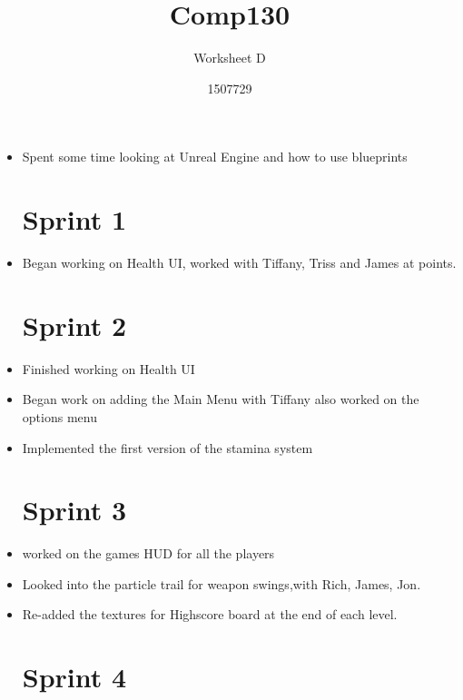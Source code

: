 \documentclass{scrartcl}
\title{Comp130}
\subtitle{Worksheet D}
\author{1507729}
\begin{document}
\maketitle

\begin{itemize}

\section{Sprint 0}

\item Spent some time looking at Unreal Engine and how to use blueprints


\section{Sprint 1}

\item Began working on Health UI, worked with Tiffany, Triss and James at points.


\section{Sprint 2}

\item Finished working on Health UI

\item Began work on adding the Main Menu with Tiffany also worked on the options menu

\item Implemented the first version of the stamina system


\section{Sprint 3}

\item worked on the games HUD for all the players

\item Looked into the particle trail for weapon swings,with Rich, James, Jon.

\item Re-added the textures for Highscore board at the end of each level.

\section{Sprint 4}

\end{itemize}
\end{document}
